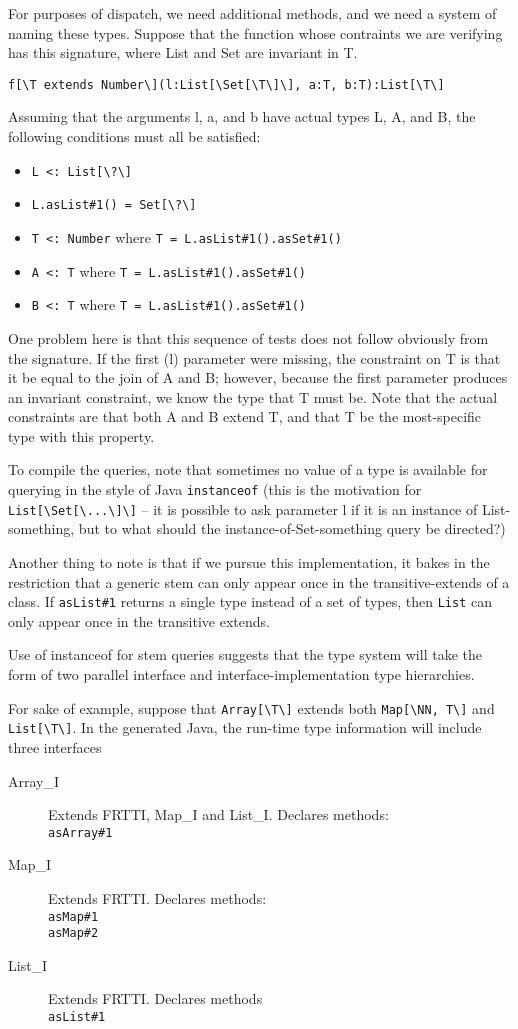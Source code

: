 \documentclass[11pt]{article}
\begin{document}
For purposes of dispatch, we need additional methods, and we need a system of naming these types.  Suppose that the function whose contraints we are verifying has this signature, where List and Set are invariant in T.
\begin{verbatim}
f[\T extends Number\](l:List[\Set[\T\]\], a:T, b:T):List[\T\]
\end{verbatim}
Assuming that the arguments l, a, and b have actual types L, A, and B, the following conditions must all be satisfied:
\begin{itemize}
\item \verb+L <: List[\?\]+
\item \verb+L.asList#1() = Set[\?\]+
\item \verb+T <: Number+ where \verb+T = L.asList#1().asSet#1()+
\item \verb+A <: T+ where \verb+T = L.asList#1().asSet#1()+
\item \verb+B <: T+ where \verb+T = L.asList#1().asSet#1()+
\end{itemize}
One problem here is that this sequence of tests does not follow obviously from the signature.
If the first (l) parameter were missing, the constraint on T is that it be equal to the join of A and B; however, because the first parameter produces an invariant constraint, we know the type that T must be.  Note that the actual constraints are that both A and B extend T, and that T be the most-specific type with this property.

To compile the queries, note that sometimes no value of a type is available for querying in the style of Java \verb+instanceof+ (this is the motivation for \verb+List[\Set[\...\]\]+ -- it is possible to ask parameter l if it is an instance of List-something, but to what should the instance-of-Set-something query be directed?)

Another thing to note is that if we pursue this implementation, it bakes in the restriction that a generic stem can only appear once in the transitive-extends of a class.  If \verb+asList#1+ returns a single type instead of a set of types, then \verb+List+ can only appear once in the transitive extends.

Use of instanceof for stem queries suggests that the type system will take the form of two parallel interface and interface-implementation type hierarchies.

For sake of example, suppose that \verb+Array[\T\]+ extends both \verb+Map[\NN, T\]+ and \verb+List[\T\]+.  In the generated Java, the run-time type information will include three interfaces
\begin{description}
\item[Array\_I] Extends FRTTI, Map\_I and List\_I. Declares methods:\\
\verb+asArray#1+
\item[Map\_I] Extends FRTTI.  Declares methods:\\
\verb+asMap#1+\\
\verb+asMap#2+
\item[List\_I] Extends FRTTI.  Declares methods\\
\verb+asList#1+
\end{description}
\end{document}
